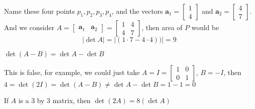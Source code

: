 \documentclass[a4paper,10pt]{article}
\begin{document}
\begin{solution}
Name these four points $p_1,p_2,p_3,p_4$, and the vectors $\mathbf a_1=\begin{bmatrix}
1\\4
\end{bmatrix}$ and $\mathbf a_2=\begin{bmatrix}
4\\7
\end{bmatrix}$. And we consider $A=\begin{bmatrix}
\mathbf a_1&\mathbf a_2
\end{bmatrix}=\begin{bmatrix}
1&4\\
4&7
\end{bmatrix}$, then area of $P$ would be
\[
\left|\det A\right|=\left|(1\cdot7-4\cdot4))\right|=9
\]
\begin{center}
\end{center}
\end{solution}

\begin{problem}
$\det(A-B)=\det A-\det B$
\end{problem}

\begin{solution}
This is false, for example, we could just take $A=I=\begin{bmatrix}
1&0\\0&1
\end{bmatrix}$, $B=-I$, then $4=\det(2I)=\det(A-B)\neq \det A-\det B=1-1=0$
\end{solution}

\begin{problem}
If $A$ is a 3 by 3 matrix, then $\det(2A)=8(\det A)$
\end{problem}
\end{document}
